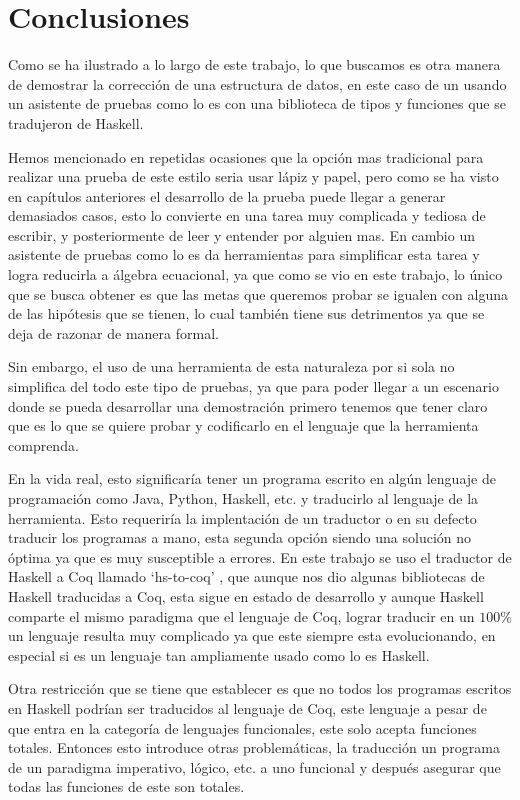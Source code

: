  \chapter{Conclusiones}
Como se ha ilustrado a lo largo de este trabajo, lo que buscamos es otra manera de demostrar la correcci\'on de una estructura de datos,
en este caso de un {\arn} usando un asistente de pruebas como lo es {\coq} con una biblioteca de
tipos y funciones que se tradujeron de Haskell.

Hemos mencionado en repetidas ocasiones que la opci\'on mas tradicional para realizar una prueba de este estilo seria
usar lápiz y papel, pero como se ha visto en capítulos anteriores el desarrollo de la prueba puede llegar a generar demasiados
casos, esto lo convierte en una tarea muy complicada y tediosa de escribir, y posteriormente de leer y
entender por alguien mas. En cambio un asistente de pruebas como lo es {\coq} da herramientas para
simplificar esta tarea y logra reducirla a álgebra ecuacional, ya que como se vio en este trabajo,
lo \'unico que se busca obtener es que las metas que queremos probar se igualen con alguna de las
hip\'otesis que se tienen, lo cual también tiene sus detrimentos ya que se deja de razonar de manera formal.

Sin embargo, el uso de una herramienta de esta naturaleza por si sola no simplifica del todo este
tipo de pruebas, ya que para poder llegar a un escenario donde se pueda desarrollar una demostraci\'on primero
tenemos que tener claro que es lo que se quiere probar y codificarlo en el lenguaje que la
herramienta comprenda.

En la vida real, esto significaría tener un programa escrito en algún lenguaje de programaci\'on
como Java, Python, Haskell, etc. y traducirlo al lenguaje de la herramienta. Esto requeriría la
implentaci\'on de un traductor o en su defecto traducir los programas a mano, esta segunda opci\'on
siendo una soluci\'on no \'optima ya que es muy susceptible a errores. En este trabajo se uso el
traductor de Haskell a Coq llamado `hs-to-coq' \cite{thrc}, que aunque nos dio algunas bibliotecas
de Haskell traducidas a Coq, esta sigue en estado de desarrollo y aunque Haskell comparte el mismo
paradigma que el lenguaje de Coq, lograr traducir en un $100\%$ un lenguaje resulta muy complicado
ya que este siempre esta evolucionando, en especial si es un lenguaje tan ampliamente usado como
lo es Haskell.

Otra restricci\'on que se tiene que establecer es que no todos los programas escritos en Haskell podrían ser traducidos
al lenguaje de Coq, este lenguaje a pesar de que entra en la categoría de lenguajes funcionales, este solo acepta funciones totales. Entonces esto introduce otras problemáticas,
la traducción un programa de un paradigma imperativo, l\'ogico, etc. a uno funcional y después
asegurar que todas las funciones de este son totales.

